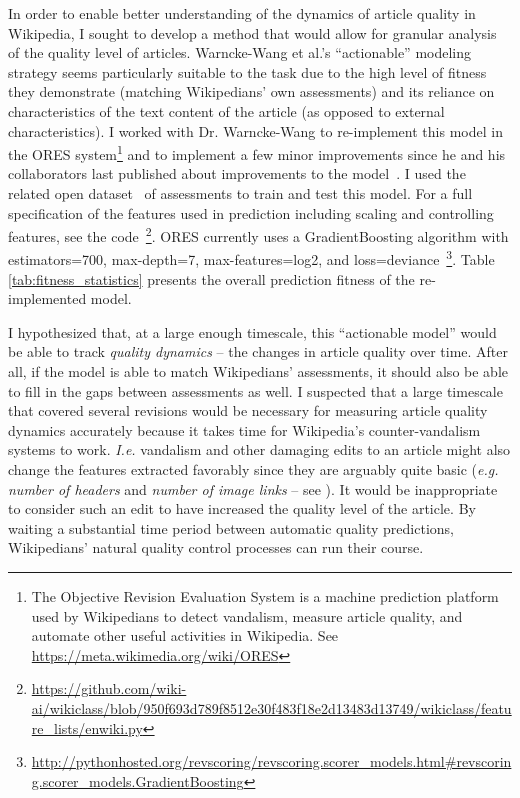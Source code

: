 
In order to enable better understanding of the dynamics of article quality in Wikipedia, I sought to develop a method that would allow for granular analysis of the quality level of articles.  Warncke-Wang et al.'s ``actionable'' modeling strategy seems particularly suitable to the task due to the high level of fitness they demonstrate (matching Wikipedians' own assessments) and its reliance on characteristics of the text content of the article (as opposed to external characteristics).  I worked with Dr. Warncke-Wang to re-implement this model in the ORES system\footnote{The Objective Revision Evaluation System is a machine prediction platform used by Wikipedians to detect vandalism, measure article quality, and automate other useful activities in Wikipedia. See \url{https://meta.wikimedia.org/wiki/ORES}} and to implement a few minor improvements since he and his collaborators last published about improvements to the model~\cite{wang15success}.  I used the related open dataset~\cite{wang15english} of assessments to train and test this model.  For a full specification of the features used in prediction including scaling and controlling features, see the code~\footnote{\url{https://github.com/wiki-ai/wikiclass/blob/950f693d789f8512e30f483f18e2d13483d13749/wikiclass/feature_lists/enwiki.py}}.  ORES currently uses a GradientBoosting algorithm with estimators=700, max-depth=7, max-features=log2, and loss=deviance~\footnote{\url{http://pythonhosted.org/revscoring/revscoring.scorer_models.html\#revscoring.scorer_models.GradientBoosting}}.  Table \ref{tab:fitness_statistics} presents the overall prediction fitness of the re-implemented model.


 I hypothesized that, at a large enough timescale, this ``actionable model'' would be able to track \emph{quality dynamics} -- the changes in article quality over time.  After all, if the model is able to match Wikipedians' assessments, it should also be able to fill in the gaps between assessments as well.  I suspected that a large timescale that covered several revisions would be necessary for measuring article quality dynamics accurately because it takes time for Wikipedia's counter-vandalism systems to work.  \emph{I.e.} vandalism and other damaging edits to an article might also change the features extracted favorably since they are arguably quite basic (\emph{e.g.} \emph{number of headers} and \emph{number of image links} -- see \cite{wang13tell}).  It would be inappropriate to consider such an edit to have increased the quality level of the article.  By waiting a substantial time period between automatic quality predictions, Wikipedians' natural quality control processes can run their course.

